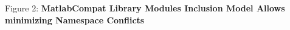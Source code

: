 Figure 2: \textbf{MatlabCompat Library Modules Inclusion Model Allows minimizing Namespace Conflicts}